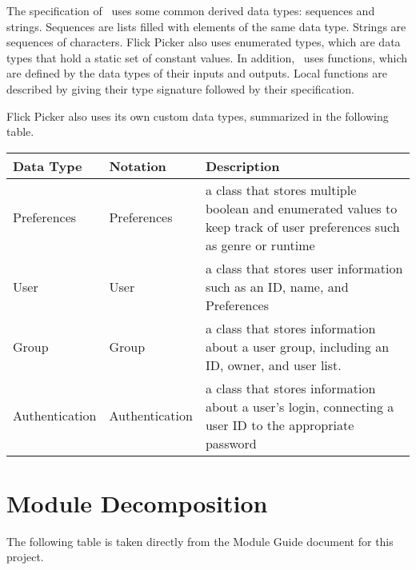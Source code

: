 \documentclass[12pt, titlepage]{article}
\begin{document}
\noindent
The specification of \progname \ uses some common derived data types: sequences and strings. Sequences are lists filled with elements of the same data type. Strings are sequences of characters. Flick Picker also uses enumerated types, which are data types that hold a static set of constant values. In addition, \progname \ uses functions, which are defined by the data types of their inputs and outputs. Local functions are
described by giving their type signature followed by their specification.\pagebreak

Flick Picker also uses its own custom data types, summarized in the following table.



\begin{center}
	\renewcommand{\arraystretch}{1.2}
	\noindent 
	\begin{tabular}{l l p{7.5cm}} 
		\toprule 
		\textbf{Data Type} & \textbf{Notation} & \textbf{Description}\\ 
		\midrule
		Preferences & Preferences & a class that stores multiple boolean and enumerated values to keep track of user preferences such as genre or runtime\\
		User & User & a class that stores user information such as an ID, name, and Preferences \\
		Group & Group & a class that stores information about a user group, including an ID, owner, and user list. \\
		Authentication & Authentication & a class that stores information about a user's login, connecting a user ID to the appropriate password\\		
		\bottomrule
	\end{tabular} 
\end{center}





\section{Module Decomposition}

The following table is taken directly from the Module Guide document for this project.
\end{document}

